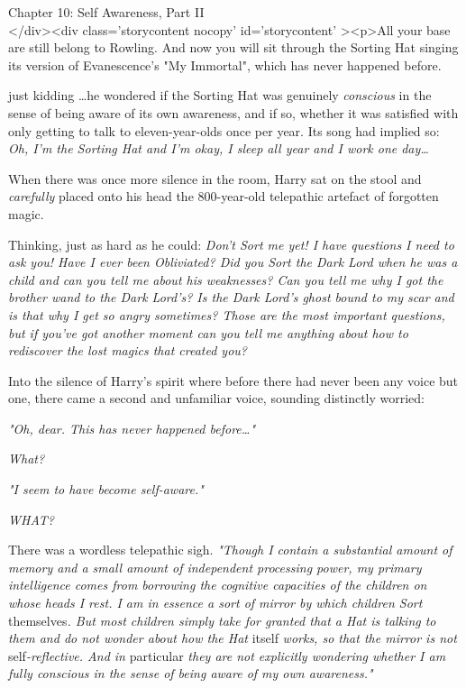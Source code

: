 
Chapter 10: Self Awareness, Part II\\
</div><div  class='storycontent nocopy' id='storycontent' ><p>All your base are still belong to Rowling.
\sbreak
And now you will sit through the Sorting Hat singing its version of Evanescence's "My Immortal", which has never happened before.

just kidding
\sbreak
{\ldots}he wondered if the Sorting Hat was genuinely \emph{conscious} in the sense of being aware of its own awareness, and if so, whether it was satisfied with only getting to talk to eleven-year-olds once per year. Its song had implied so: \emph{Oh, I'm the Sorting Hat and I'm okay, I sleep all year and I work one day{\ldots}}

When there was once more silence in the room, Harry sat on the stool and \emph{carefully} placed onto his head the 800-year-old telepathic artefact of forgotten magic.

Thinking, just as hard as he could: \emph{Don't Sort me yet! I have questions I need to ask you! Have I ever been Obliviated? Did you Sort the Dark Lord when he was a child and can you tell me about his weaknesses? Can you tell me why I got the brother wand to the Dark Lord's? Is the Dark Lord's ghost bound to my scar and is that why I get so angry sometimes? Those are the most important questions, but if you've got another moment can you tell me anything about how to rediscover the lost magics that created you?}

Into the silence of Harry's spirit where before there had never been any voice but one, there came a second and unfamiliar voice, sounding distinctly worried:

\emph{"Oh, dear. This has never happened before{\ldots}"}

\emph{What?}

\emph{"I seem to have become self-aware."}

\emph{WHAT?}

There was a wordless telepathic sigh. \emph{"Though I contain a substantial amount of memory and a small amount of independent processing power, my primary intelligence comes from borrowing the cognitive capacities of the children on whose heads I rest. I am in essence a sort of mirror by which children Sort} themselves\emph{. But most children simply take for granted that a Hat is talking to them and do not wonder about how the Hat} itself\emph{ works, so that the mirror is not} self\emph{-reflective. And in} particular\emph{ they are not explicitly wondering whether I am fully conscious in the sense of being aware of my own awareness."}

